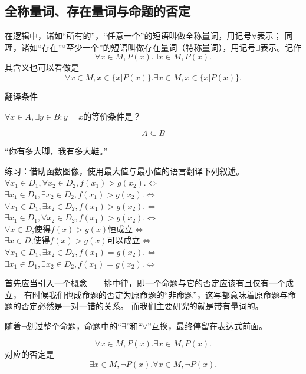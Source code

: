 \subsection{全称量词、存在量词与命题的否定}
\begin{definition}
    在逻辑中，诸如“所有的”，“任意一个”的短语叫做全称量词，用记号$\forall$表示；
同理，诸如“存在”“至少一个”的短语叫做存在量词（特称量词），用记号$\exists$表示。记作
\[\forall x\in M,P(x).\exists x\in M,P(x).\]
其含义也可以看做是
\[\forall x\in M,x\in \{x|P(x)\}.\exists x\in M,x\in \{x|P(x)\}.\]
\end{definition}
翻译条件
\begin{example}
    $\forall x\in A,\exists y\in B : y=x$的等价条件是？
\end{example}

\begin{jie}
    \[A\subseteq B\]
\end{jie}


“你有多大脚，我有多大鞋。”


练习：借助函数图像，使用最大值与最小值的语言翻译下列叙述。
\\$\forall x_1 \in D_1,\forall x_2 \in D_2,f(x_1)>g(x_2).\Leftrightarrow$
\\$\exists x_1 \in D_1,\exists x_2 \in D_2,f(x_1)>g(x_2).\Leftrightarrow$
\\$\forall x_1 \in D_1,\exists x_2 \in D_2,f(x_1)>g(x_2).\Leftrightarrow$
\\$\exists x_1 \in D_1,\forall x_2 \in D_2,f(x_1)>g(x_2).\Leftrightarrow$
\\$\forall x \in D$,使得$f(x)>g(x)$恒成立$\Leftrightarrow$
\\$\exists x \in D$,使得$f(x)>g(x)$可以成立$\Leftrightarrow$
\\$\forall x_1 \in D_1,\exists x_2 \in D_2,f(x_1)=g(x_2).\Leftrightarrow$
\\$\exists x_1 \in D_1,\exists x_2 \in D_2,f(x_1)=g(x_2).\Leftrightarrow$


首先应当引入一个概念——排中律，即一个命题与它的否定应该有且仅有一个成立，
有时候我们也成命题的否定为原命题的“非命题”，这写都意味着原命题与命题的否定必然是一对一错的关系。
而我们主要研究的就是带有量词的。
\begin{theorem}
    随着$\neg$划过整个命题，命题中的“$\exists$”和$“\forall$”互换，最终停留在表达式前面。
\end{theorem}

\begin{example}
    \[\forall x\in M,P(x).\exists x\in M,P(x).\]
对应的否定是
\[\exists x\in M,\neg P(x).\forall x\in M,\neg P(x).\]
\end{example}


